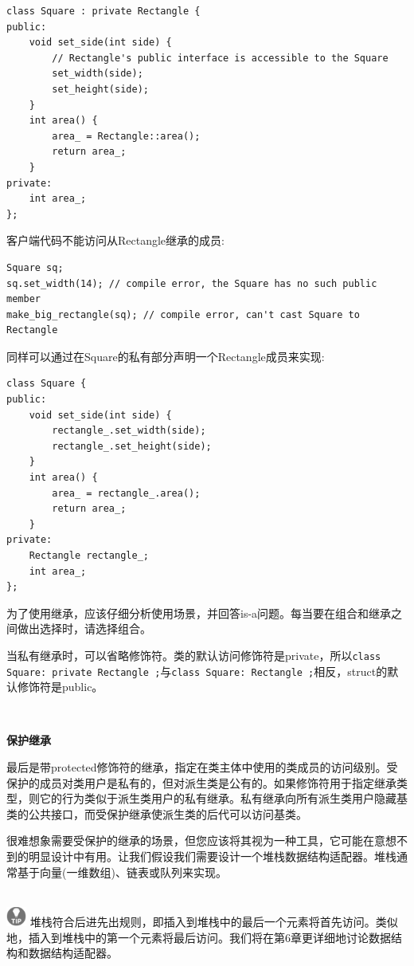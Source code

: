 \begin{lstlisting}[caption={}]
class Square : private Rectangle {
public:
	void set_side(int side) {
		// Rectangle's public interface is accessible to the Square
		set_width(side);
		set_height(side);
	}
	int area() {
		area_ = Rectangle::area();
		return area_;
	}
private:
	int area_;
};
\end{lstlisting}

客户端代码不能访问从Rectangle继承的成员: \par

\begin{lstlisting}[caption={}]
Square sq;
sq.set_width(14); // compile error, the Square has no such public member
make_big_rectangle(sq); // compile error, can't cast Square to Rectangle
\end{lstlisting}

同样可以通过在Square的私有部分声明一个Rectangle成员来实现: \par

\begin{lstlisting}[caption={}]
class Square {
public:
	void set_side(int side) {
		rectangle_.set_width(side);
		rectangle_.set_height(side);
	}
	int area() {
		area_ = rectangle_.area();
		return area_;
	}
private:
	Rectangle rectangle_;
	int area_;
};
\end{lstlisting}

为了使用继承，应该仔细分析使用场景，并回答is-a问题。每当要在组合和继承之间做出选择时，请选择组合。 \par
当私有继承时，可以省略修饰符。类的默认访问修饰符是private，所以\texttt{class Square: private Rectangle {};}与\texttt{class Square: Rectangle {};}相反，struct的默认修饰符是public。\par

\noindent\textbf{}\ \par
\textbf{保护继承} \ \par
最后是带protected修饰符的继承，指定在类主体中使用的类成员的访问级别。受保护的成员对类用户是私有的，但对派生类是公有的。如果修饰符用于指定继承类型，则它的行为类似于派生类用户的私有继承。私有继承向所有派生类用户隐藏基类的公共接口，而受保护继承使派生类的后代可以访问基类。 \par
很难想象需要受保护的继承的场景，但您应该将其视为一种工具，它可能在意想不到的明显设计中有用。让我们假设我们需要设计一个堆栈数据结构适配器。堆栈通常基于向量(一维数组)、链表或队列来实现。 \par

\hspace*{\fill} \\ %
\includegraphics[width=0.05\textwidth]{images/tip}
堆栈符合后进先出规则，即插入到堆栈中的最后一个元素将首先访问。类似地，插入到堆栈中的第一个元素将最后访问。我们将在第6章更详细地讨论数据结构和数据结构适配器。 \par
\noindent\textbf{}\ \par

